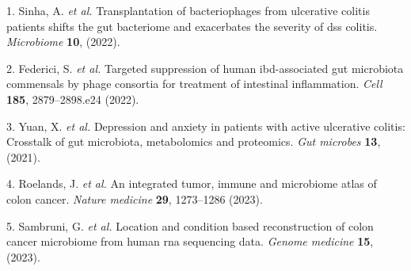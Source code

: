 \documentclass[
]{article}
\newenvironment{cslreferences}%
  {}%
  {\par}
\begin{document}
\hypertarget{refs}{}
\begin{cslreferences}
\leavevmode\hypertarget{ref-TransplantationSinha2022}{}%
1. Sinha, A. \emph{et al.} Transplantation of bacteriophages from ulcerative colitis patients shifts the gut bacteriome and exacerbates the severity of dss colitis. \emph{Microbiome} \textbf{10}, (2022).

\leavevmode\hypertarget{ref-TargetedSuppreFederi2022}{}%
2. Federici, S. \emph{et al.} Targeted suppression of human ibd-associated gut microbiota commensals by phage consortia for treatment of intestinal inflammation. \emph{Cell} \textbf{185}, 2879--2898.e24 (2022).

\leavevmode\hypertarget{ref-DepressionAndYuan2021}{}%
3. Yuan, X. \emph{et al.} Depression and anxiety in patients with active ulcerative colitis: Crosstalk of gut microbiota, metabolomics and proteomics. \emph{Gut microbes} \textbf{13}, (2021).

\leavevmode\hypertarget{ref-AnIntegratedTRoelan2023}{}%
4. Roelands, J. \emph{et al.} An integrated tumor, immune and microbiome atlas of colon cancer. \emph{Nature medicine} \textbf{29}, 1273--1286 (2023).

\leavevmode\hypertarget{ref-LocationAndCoSambru2023}{}%
5. Sambruni, G. \emph{et al.} Location and condition based reconstruction of colon cancer microbiome from human rna sequencing data. \emph{Genome medicine} \textbf{15}, (2023).
\end{cslreferences}
\end{document}
